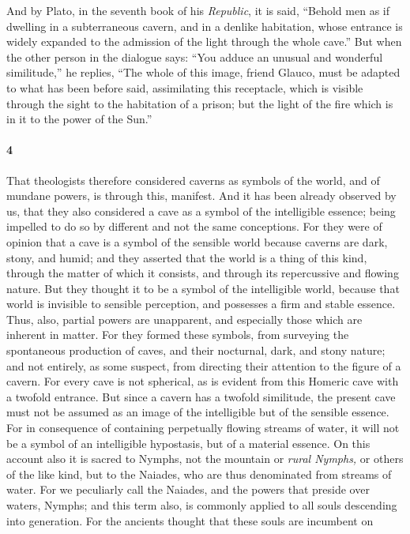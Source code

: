 \documentclass[12pt]{article}
\begin{document}
\noindent And by Plato, in the seventh book of his \textit{Republic}, it is
said, ``Behold men as if dwelling in a subterraneous cavern, and in a denlike
habitation, whose entrance is widely expanded to the admission of the light
through the whole cave.'' But when the other person in the dialogue says: ``You
adduce an unusual and wonderful similitude,'' he replies, ``The whole of this
image, friend Glauco, must be adapted to what has been before said,
assimilating this receptacle, which is visible through the sight to the
habitation of a prison; but the light of the fire which is in it to the power
of the Sun.''


\paragraph{4} That theologists therefore considered caverns as symbols of the
world, and of mundane powers, is through this, manifest. And it has been
already observed by us, that they also considered a cave as a symbol of the
intelligible essence; being impelled to do so by different and not the same
conceptions. For they were of opinion that a cave is a symbol of the sensible
world because caverns are dark, stony, and humid; and they asserted that the
world is a thing of this kind, through the matter of which it consists, and
through its repercussive and flowing nature. But they thought it to be a symbol
of the intelligible world, because that world is invisible to sensible
perception, and possesses a firm and stable essence. Thus, also, partial powers
are unapparent, and especially those which are inherent in matter. For they
formed these symbols, from surveying the spontaneous production of caves, and
their nocturnal, dark, and stony nature; and not entirely, as some suspect,
from directing their attention to the figure of a cavern. For every cave is not
spherical, as is evident from this Homeric cave with a twofold entrance. But
since a cavern has a twofold similitude, the present cave must not be assumed
as an image of the intelligible but of the sensible essence. For in consequence
of containing perpetually flowing streams of water, it will not be a symbol of
an intelligible hypostasis, but of a material essence. On this account also it
is sacred to Nymphs, not the mountain or \textit{rural Nymphs,} or others of
the like kind, but to the Naiades, who are thus denominated from streams of
water. For we peculiarly call the Naiades, and the powers that preside over
waters, Nymphs; and this term also, is commonly applied to all souls descending
into generation. For the ancients thought that these souls are incumbent on
\end{document}
